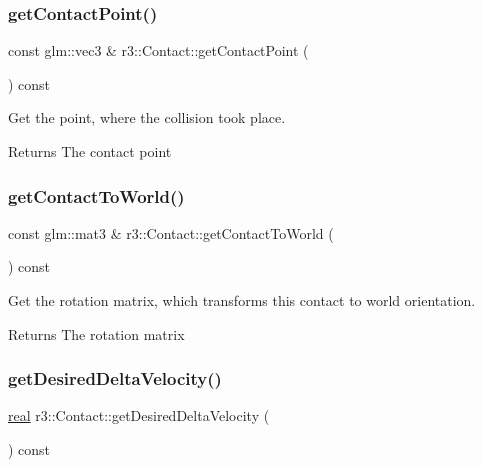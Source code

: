 \subsubsection{\texorpdfstring{get\+Contact\+Point()}{getContactPoint()}}
{\footnotesize\ttfamily const glm\+::vec3 \& r3\+::\+Contact\+::get\+Contact\+Point (\begin{DoxyParamCaption}{ }\end{DoxyParamCaption}) const}



Get the point, where the collision took place. 

\begin{DoxyReturn}{Returns}
The contact point 
\end{DoxyReturn}
\mbox{\label{classr3_1_1_contact_a4e9692d870bdba44ff6b627b8c6c6e30}} 
\subsubsection{\texorpdfstring{get\+Contact\+To\+World()}{getContactToWorld()}}
{\footnotesize\ttfamily const glm\+::mat3 \& r3\+::\+Contact\+::get\+Contact\+To\+World (\begin{DoxyParamCaption}{ }\end{DoxyParamCaption}) const}



Get the rotation matrix, which transforms this contact to world orientation. 

\begin{DoxyReturn}{Returns}
The rotation matrix 
\end{DoxyReturn}
\mbox{\label{classr3_1_1_contact_aff234679aa4302b69b8dd101eb969705}} 
\subsubsection{\texorpdfstring{get\+Desired\+Delta\+Velocity()}{getDesiredDeltaVelocity()}}
{\footnotesize\ttfamily \mbox{\hyperlink{namespacer3_ab2016b3e3f743fb735afce242f0dc1eb}{real}} r3\+::\+Contact\+::get\+Desired\+Delta\+Velocity (\begin{DoxyParamCaption}{ }\end{DoxyParamCaption}) const}



